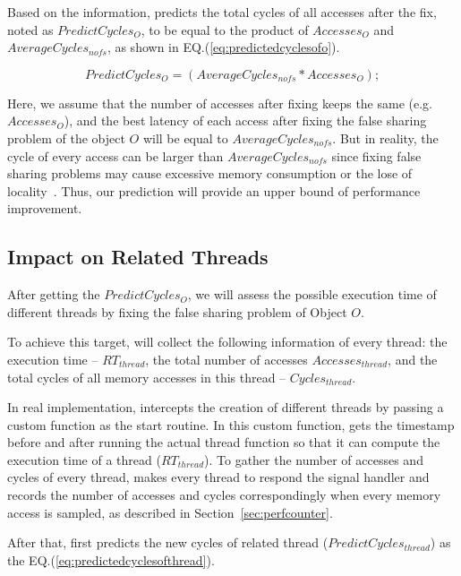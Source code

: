 Based on the information, \cheetah{} predicts the total cycles of all accesses after the fix, noted as $PredictCycles_{O}$, to be equal to  
 the product of $Accesses_O$ and $AverageCycles_{nofs}$, as shown in EQ.(\ref{eq:predictedcyclesofo}).
 
\begin{equation}
\label{eq:predictedcyclesofo}
 PredictCycles_{O} = (AverageCycles_{nofs} * Accesses_O);
\end{equation} 
 
Here, we assume that the number of accesses after fixing keeps the same (e.g. $Accesses_O$), and the best latency of each access after fixing the false sharing problem of the object $O$ will be equal to $AverageCycles_{nofs}$. But in reality, the cycle of every access can be larger than $AverageCycles_{nofs}$ since fixing false sharing problems may cause excessive memory consumption or the lose of locality~\cite{qinzhao}. Thus, our prediction will provide an upper bound of performance improvement. 


\subsection{Impact on Related Threads}
\label{sec:impactthread}

After getting the $PredictCycles_{O}$, we will assess the possible execution time of different threads by fixing the false sharing problem of Object $O$. 

To achieve this target, \Cheetah{} will collect the following information of every thread: the execution time -- $RT_{thread}$, the total number of accesses $Accesses_{thread}$, and the total cycles of all memory accesses in this thread -- $Cycles_{thread}$.

In real implementation, \cheetah{} intercepts the creation of different threads by passing a custom function as the start routine. In this custom function, \cheetah{} gets the timestamp before and after running the actual thread function so that it can compute the execution time of a thread ($RT_{thread}$). To gather the number of accesses and cycles of every thread, \cheetah{} makes every thread to respond the signal handler and records the number of accesses and cycles correspondingly when every memory access is sampled, as described in Section~\ref{sec:perfcounter}. 

After that, \cheetah{} first predicts the new cycles of related thread ($PredictCycles_{thread}$) as the EQ.(\ref{eq:predictedcyclesofthread}).


